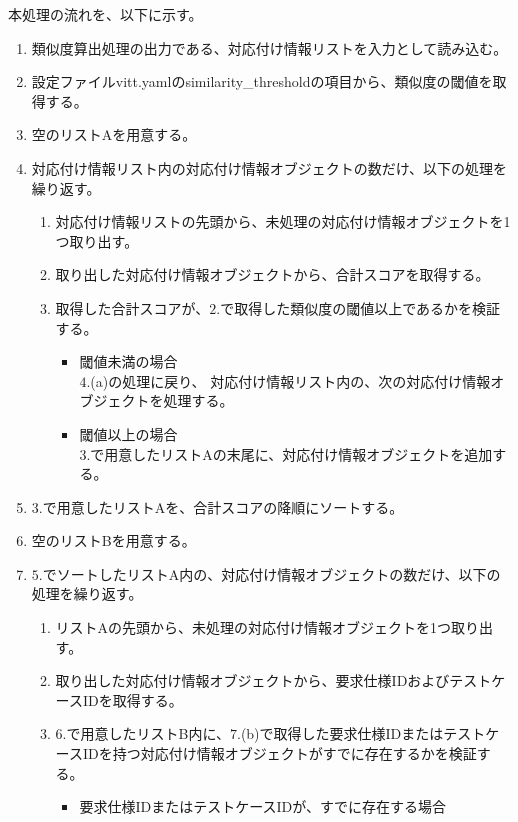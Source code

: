 本処理の流れを、以下に示す。
\begin{enumerate}
    \item 類似度算出処理の出力である、対応付け情報リストを入力として読み込む。
    \item 設定ファイルvitt.yamlのsimilarity\_thresholdの項目から、類似度の閾値を取得する。
    \item 空のリストAを用意する。
    \item 対応付け情報リスト内の対応付け情報オブジェクトの数だけ、以下の処理を繰り返す。
    \begin{enumerate}
        \item 対応付け情報リストの先頭から、未処理の対応付け情報オブジェクトを1つ取り出す。
        \item 取り出した対応付け情報オブジェクトから、合計スコアを取得する。
        \item 取得した合計スコアが、$2$.で取得した類似度の閾値以上であるかを検証する。
        \begin{itemize}
            \item 閾値未満の場合\\
            $4$.(a)の処理に戻り、 対応付け情報リスト内の、次の対応付け情報オブジェクトを処理する。
            \item 閾値以上の場合\\
            $3$.で用意したリストAの末尾に、対応付け情報オブジェクトを追加する。
        \end{itemize}
    \end{enumerate}
    \item $3$.で用意したリストAを、合計スコアの降順にソートする。
    \item 空のリストBを用意する。
    \item $5$.でソートしたリストA内の、対応付け情報オブジェクトの数だけ、以下の処理を繰り返す。
    \begin{enumerate}
        \item リストAの先頭から、未処理の対応付け情報オブジェクトを1つ取り出す。
        \item 取り出した対応付け情報オブジェクトから、要求仕様IDおよびテストケースIDを取得する。
        \item $6$.で用意したリストB内に、$7$.(b)で取得した要求仕様IDまたはテストケースIDを持つ対応付け情報オブジェクトがすでに存在するかを検証する。
        \begin{itemize}
            \item 要求仕様IDまたはテストケースIDが、すでに存在する場合\\

\end{itemize}
\end{enumerate}
\end{enumerate}
